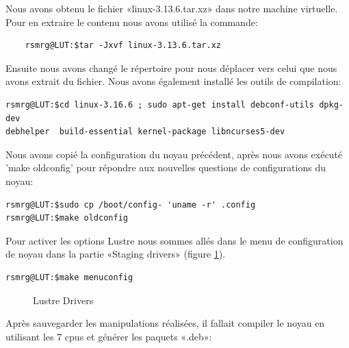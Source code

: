\documentclass[12pt]{article}
\begin{document}
Nous avons obtenu le fichier «linux-3.13.6.tar.xz» dans notre machine virtuelle. Pour en extraire le contenu nous avons utilisé la commande:

\begin{verbatim}
	rsmrg@LUT:$tar -Jxvf linux-3.13.6.tar.xz
\end{verbatim}

Ensuite nous avons changé le répertoire pour nous déplacer vers celui que nous avons extrait du fichier. Nous avons également installé les outils de compilation:

\begin{verbatim}
rsmrg@LUT:$cd linux-3.16.6 ; sudo apt-get install debconf-utils dpkg-dev
debhelper  build-essential kernel-package libncurses5-dev
\end{verbatim}

Nous avons copié la configuration du noyau précédent, après nous avons exécuté 'make oldconfig' pour répondre aux nouvelles questions de configurations du noyau:

\begin{verbatim}
rsmrg@LUT:$sudo cp /boot/config- 'uname -r' .config
rsmrg@LUT:$make oldconfig
\end{verbatim}

Pour activer les options Lustre nous sommes allés dans le menu de configuration de noyau dans la partie «Staging drivers» (figure \ref{kernel}).

\begin{verbatim}
rsmrg@LUT:$make menuconfig
\end{verbatim}

\begin{figure}[Lustre Options]
\caption{Lustre Drivers}
\label{kernel}
\end{figure}

Après sauvegarder les manipulations réalisées, il fallait compiler le noyau en utilisant les 7 cpus et générer les paquets «.deb»:
\end{document}
